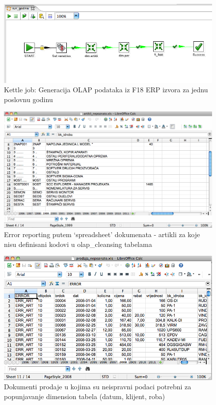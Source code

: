 \documentclass[times, utf8, seminar]{fit}
\begin{document}
\begin{figure}[H]
\centering
\includegraphics[width=15cm]{img/kettle_job_run_godina.png}
\caption{Kettle job: Generacija OLAP podataka iz F18 ERP izvora za jednu poslovnu godinu}
\end{figure}


\begin{figure}[H]
\centering
\includegraphics[width=15cm]{img/nepoznato_artikli.png}
\caption{Error reporting putem `spreadsheet' dokumenata - artikli za koje nisu definisani kodovi u olap\_cleansing tabelama}
\end{figure}

\begin{figure}[H]
\centering
\includegraphics[width=15cm]{img/nepoznato_prodaja.png}
\caption{Dokumenti prodaje u kojima su neispravni podaci potrebni za popunjavanje dimension tabela (datum, klijent, roba) }
\end{figure}
\end{document}
